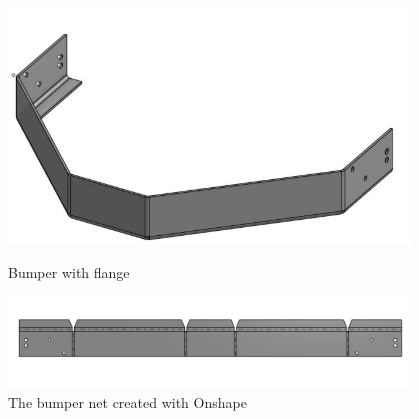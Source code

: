 \begin{figure}[ht]
\centering
\begin{minipage}[b]{.48\textwidth}
  \centering
  \includegraphics[width=0.95\textwidth]{Meetings/November/11-01-21/11-1-21_Hardware_Figure1 - Nathan Forrer.JPG}
  \caption{Bumper with flange}
  \label{fig:110121_4}
\end{minipage}%
\hfill%
\begin{minipage}[b]{.48\textwidth}
  \centering
  \includegraphics[width=0.95\textwidth]{Meetings/November/11-01-21/11-1-21_Hardware_Figure2 - Nathan Forrer.JPG}
  \caption{The bumper net created with Onshape}
  \label{fig:110121_5}
\end{minipage}
\end{figure}

